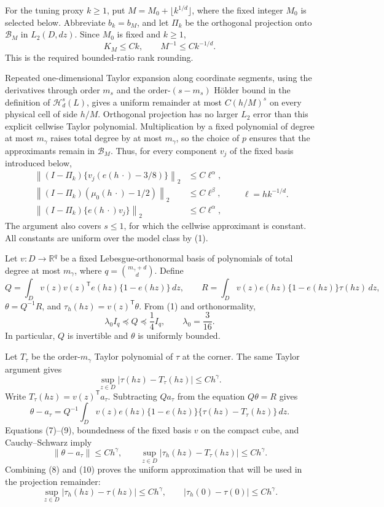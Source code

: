 For the tuning proxy \(k\geq1\), put \(M=M_0+\lfloor k^{1/d}\rfloor\), where the fixed integer \(M_0\) is selected below.  Abbreviate \(b_k=b_M\), and let \(\Pi_k\) be the orthogonal projection onto \(\mathcal B_M\) in \(L_2(D,dz)\).  Since \(M_0\) is fixed and \(k\geq1\),
\[
 K_M\leq Ck,
 \qquad M^{-1}\leq Ck^{-1/d}.
 \tag{4}
\]
This is the required bounded-ratio rank rounding.

Repeated one-dimensional Taylor expansion along coordinate segments, using the derivatives through order \(m_s\) and the order-\((s-m_s)\) H\"older bound in the definition of \(\mathcal H_d^s(L)\), gives a uniform remainder at most \(C(h/M)^s\) on every physical cell of side \(h/M\).  Orthogonal projection has no larger \(L_2\) error than this explicit cellwise Taylor polynomial.  Multiplication by a fixed polynomial of degree at most \(m_\gamma\) raises total degree by at most \(m_\gamma\), so the choice of \(p\) ensures that the approximants remain in \(\mathcal B_M\).  Thus, for every component \(v_j\) of the fixed basis introduced below,
\[
 \begin{split}
 \left\|(I-\Pi_k)\{v_j(e(h\,\cdot)-3/8)\}\right\|_2&\leq C\ell^\alpha,\\
 \left\|(I-\Pi_k)(\mu_0(h\,\cdot)-1/2)\right\|_2&\leq C\ell^\beta,\\
 \left\|(I-\Pi_k)\{e(h\,\cdot)v_j\}\right\|_2&\leq C\ell^\alpha,
 \end{split}
 \qquad \ell=hk^{-1/d}.
 \tag{5}
\]
The argument also covers \(s\leq1\), for which the cellwise approximant is constant.  All constants are uniform over the model class by (1).

Let \(v:D\to\mathbb R^q\) be a fixed Lebesgue-orthonormal basis of polynomials of total degree at most \(m_\gamma\), where \(q=\binom{m_\gamma+d}{d}\).  Define
\[
 Q=\int_Dv(z)v(z)^{\mathsf T}e(hz)\{1-e(hz)\}\,dz,
 \qquad
 R=\int_Dv(z)e(hz)\{1-e(hz)\}\tau(hz)\,dz,
 \tag{6}
\]
\(\theta=Q^{-1}R\), and \(\tau_h(hz)=v(z)^{\mathsf T}\theta\).  From (1) and orthonormality,
\[
 \lambda_0 I_q\preceq Q\preceq\frac14I_q,
 \qquad \lambda_0=\frac3{16}.
 \tag{7}
\]
In particular, \(Q\) is invertible and \(\theta\) is uniformly bounded.

Let \(T_\tau\) be the order-\(m_\gamma\) Taylor polynomial of \(\tau\) at the corner.  The same Taylor argument gives
\[
 \sup_{z\in D}|\tau(hz)-T_\tau(hz)|\leq Ch^\gamma.
 \tag{8}
\]
Write \(T_\tau(hz)=v(z)^{\mathsf T}a_\tau\).  Subtracting \(Qa_\tau\) from the equation \(Q\theta=R\) gives
\[
 \theta-a_\tau
 =Q^{-1}\int_Dv(z)e(hz)\{1-e(hz)\}
 \{\tau(hz)-T_\tau(hz)\}\,dz.
 \tag{9}
\]
Equations (7)--(9), boundedness of the fixed basis \(v\) on the compact cube, and Cauchy--Schwarz imply
\[
 \|\theta-a_\tau\|\leq Ch^\gamma,
 \qquad
 \sup_{z\in D}|\tau_h(hz)-T_\tau(hz)|\leq Ch^\gamma.
 \tag{10}
\]
Combining (8) and (10) proves the uniform approximation that will be used in the projection remainder:
\[
 \sup_{z\in D}|\tau_h(hz)-\tau(hz)|\leq Ch^\gamma,
 \qquad
 |\tau_h(0)-\tau(0)|\leq Ch^\gamma.
 \tag{11}
\]


